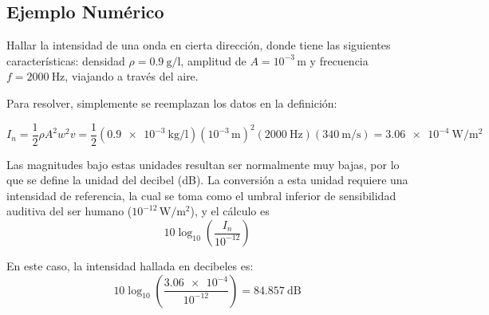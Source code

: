 \subsection{Ejemplo Numérico}

Hallar la intensidad de una onda en cierta dirección, donde tiene las
siguientes características: densidad $\rho = \qty{0.9}{\g\per\l}$,
amplitud de $A = 10^{-3}\,\si{\m}$ y frecuencia $f=\qty{2000}{\Hz}$,
viajando a través del aire.

Para resolver, simplemente se reemplazan los datos en la definición:

\[I_n = \frac{1}{2}\rho A^2 w^2 v = \frac{1}{2}
(\qty{0.9e-3}{\kg\per\l})(10^{-3}\,\si{\m})^2(\qty{2000}{\Hz})
(\qty{340}{\m\per\s})
= \qty{3.06e-4}{\watt\per\m^2}\]

Las magnitudes bajo estas unidades resultan ser normalmente muy bajas,
por lo que se define la unidad del decibel (\si{\dB}). La conversión a
esta unidad requiere una intensidad de referencia, la cual se toma como
el umbral inferior de sensibilidad auditiva del ser humano 
($10^{-12}\,\si{\watt\per\m^2}$), y el cálculo es
\[10 \log_{10}\left(\frac{I_n}{10^{-12}}\right)\]

En este caso, la intensidad hallada en decibeles es:
\[10\log_{10}\left(\frac{\num{3.06e-4}}{10^{-12}}\right) =
\qty{84.857}{\dB}\]